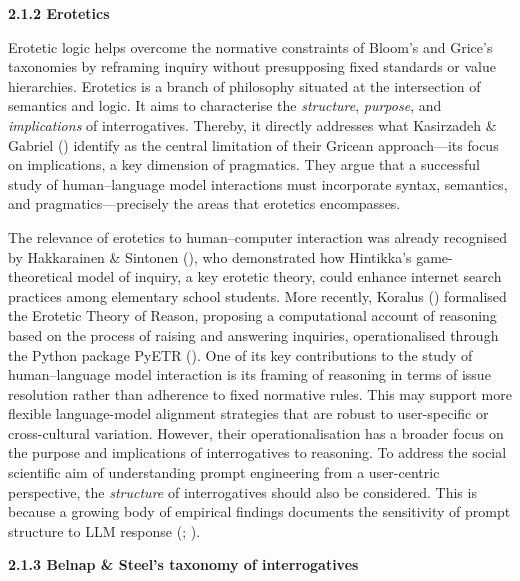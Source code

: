 \documentclass[
  12pt,
]{article}
\begin{document}
\textbf{2.1.2 Erotetics}

Erotetic logic helps overcome the normative constraints of Bloom's and Grice's taxonomies by reframing inquiry without presupposing fixed standards or value hierarchies. Erotetics is a branch of philosophy situated at the intersection of semantics and logic. It aims to characterise the \emph{structure}, \emph{purpose}, and \emph{implications} of interrogatives. Thereby, it directly addresses what Kasirzadeh \& Gabriel () identify as the central limitation of their Gricean approach---its focus on implications, a key dimension of pragmatics. They argue that a successful study of human--language model interactions must incorporate syntax, semantics, and pragmatics---precisely the areas that erotetics encompasses.

The relevance of erotetics to human--computer interaction was already recognised by Hakkarainen \& Sintonen (), who demonstrated how Hintikka's game-theoretical model of inquiry, a key erotetic theory, could enhance internet search practices among elementary school students. More recently, Koralus () formalised the Erotetic Theory of Reason, proposing a computational account of reasoning based on the process of raising and answering inquiries, operationalised through the Python package PyETR (). One of its key contributions to the study of human--language model interaction is its framing of reasoning in terms of issue resolution rather than adherence to fixed normative rules. This may support more flexible language-model alignment strategies that are robust to user-specific or cross-cultural variation. However, their operationalisation has a broader focus on the purpose and implications of interrogatives to reasoning. To address the social scientific aim of understanding prompt engineering from a user-centric perspective, the \emph{structure} of interrogatives should also be considered. This is because a growing body of empirical findings documents the sensitivity of prompt structure to LLM response (; ).

\textbf{2.1.3 Belnap \& Steel's taxonomy of interrogatives}
\end{document}
